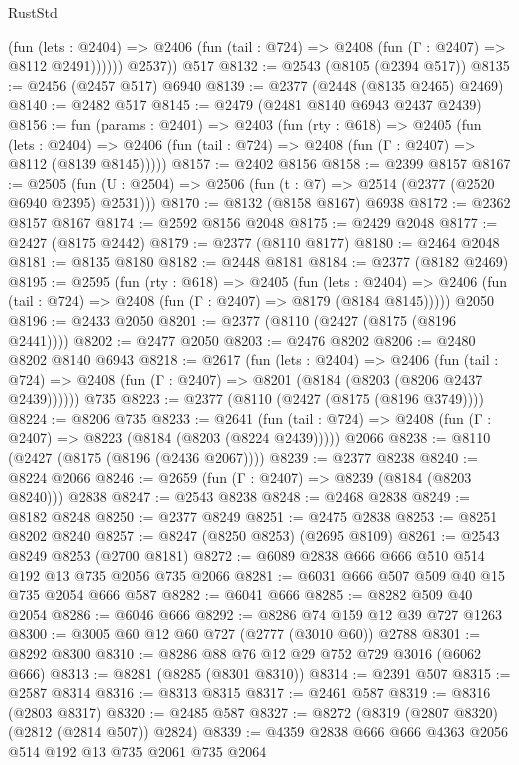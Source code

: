 \begin{lexlean}{RustStd}
\begin{coremodule}
              (fun (lets : @2404) =>
              @2406 (fun (tail : @724) => @2408 (fun (Γ : @2407) => @8112 @2491))))))
        @2537))
    @517
@8132 := @2543 (@8105 (@2394 @517))
@8135 := @2456 (@2457 @517) @6940
@8139 := @2377 (@2448 (@8135 @2465) @2469)
@8140 := @2482 @517
@8145 := @2479 (@2481 @8140 @6943 @2437 @2439)
@8156 := fun (params : @2401) =>
  @2403
    (fun (rty : @618) =>
    @2405
      (fun (lets : @2404) =>
      @2406 (fun (tail : @724) => @2408 (fun (Γ : @2407) => @8112 (@8139 @8145)))))
@8157 := @2402 @8156
@8158 := @2399 @8157
@8167 := @2505 (fun (U : @2504) => @2506 (fun (t : @7) => @2514 (@2377 (@2520 @6940 @2395) @2531)))
@8170 := @8132 (@8158 @8167) @6938
@8172 := @2362 @8157 @8167
@8174 := @2592 @8156 @2048
@8175 := @2429 @2048
@8177 := @2427 (@8175 @2442)
@8179 := @2377 (@8110 @8177)
@8180 := @2464 @2048
@8181 := @8135 @8180
@8182 := @2448 @8181
@8184 := @2377 (@8182 @2469)
@8195 := @2595
    (fun (rty : @618) =>
    @2405
      (fun (lets : @2404) =>
      @2406 (fun (tail : @724) => @2408 (fun (Γ : @2407) => @8179 (@8184 @8145)))))
    @2050
@8196 := @2433 @2050
@8201 := @2377 (@8110 (@2427 (@8175 (@8196 @2441))))
@8202 := @2477 @2050
@8203 := @2476 @8202
@8206 := @2480 @8202 @8140 @6943
@8218 := @2617
    (fun (lets : @2404) =>
    @2406
      (fun (tail : @724) => @2408 (fun (Γ : @2407) => @8201 (@8184 (@8203 (@8206 @2437 @2439))))))
    @735
@8223 := @2377 (@8110 (@2427 (@8175 (@8196 @3749))))
@8224 := @8206 @735
@8233 := @2641
    (fun (tail : @724) => @2408 (fun (Γ : @2407) => @8223 (@8184 (@8203 (@8224 @2439)))))
    @2066
@8238 := @8110 (@2427 (@8175 (@8196 (@2436 @2067))))
@8239 := @2377 @8238
@8240 := @8224 @2066
@8246 := @2659 (fun (Γ : @2407) => @8239 (@8184 (@8203 @8240))) @2838
@8247 := @2543 @8238
@8248 := @2468 @2838
@8249 := @8182 @8248
@8250 := @2377 @8249
@8251 := @2475 @2838
@8253 := @8251 @8202 @8240
@8257 := @8247 (@8250 @8253) (@2695 @8109)
@8261 := @2543 @8249 @8253 (@2700 @8181)
@8272 := @6089 @2838 @666 @666 @510 @514 @192 @13 @735 @2056 @735 @2066
@8281 := @6031 @666 @507 @509 @40 @15 @735 @2054 @666 @587
@8282 := @6041 @666
@8285 := @8282 @509 @40 @2054
@8286 := @6046 @666
@8292 := @8286 @74 @159 @12 @39 @727 @1263
@8300 := @3005 @60 @12 @60 @727 (@2777 (@3010 @60)) @2788
@8301 := @8292 @8300
@8310 := @8286 @88 @76 @12 @29 @752 @729 @3016 (@6062 @666)
@8313 := @8281 (@8285 (@8301 @8310))
@8314 := @2391 @507
@8315 := @2587 @8314
@8316 := @8313 @8315
@8317 := @2461 @587
@8319 := @8316 (@2803 @8317)
@8320 := @2485 @587
@8327 := @8272 (@8319 (@2807 @8320) (@2812 (@2814 @507)) @2824)
@8339 := @4359 @2838 @666 @666 @4363 @2056 @514 @192 @13 @735 @2061 @735 @2064

\end{coremodule}
\end{lexlean}
